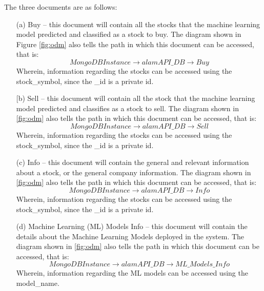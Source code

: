 The three documents are as follows:
\begin{itemize}
    \item[(a)] Buy – this document will contain all the stocks that 
    the machine learning model predicted and classified as a stock to buy. 
    The diagram shown in Figure \ref{fig:odm} also tells the path in which this 
    document can be accessed, that is: $$ MongoDB Instance \rightarrow alamAPI\_DB 
    \rightarrow Buy$$ Wherein, information regarding the stocks can be accessed using 
    the stock\_symbol, since the \_id is a private id.
    \item[[b)] Sell – this document will contain all the stock that the 
    machine learning model predicted and classifies as a stock to sell. 
    The diagram shown in \ref{fig:odm} also tells the path in which this 
    document can be accessed, that is: $$ MongoDB Instance \rightarrow 
    alamAPI\_DB \rightarrow Sell$$
     Wherein, information regarding the stocks can be accessed using the 
     stock\_symbol, since the \_id is a private id.
    \item[(c)] Info – this document will contain the general and relevant 
    information about a stock, or the general company information. 
    The diagram shown in \ref{fig:odm} also tells the path in which this 
    document can be accessed, that is: 
    $$ MongoDB Instance \rightarrow alamAPI\_DB \rightarrow Info $$ 
    Wherein, information regarding the stocks can be accessed using the 
    stock\_symbol, since the \_id is a private id.
    \item[(d)] Machine Learning (ML) Models Info – this document will contain
    the details about the Machine Learning Models deployed in the system. 
    The diagram shown in \ref{fig:odm} also tells the path in which this
    document can be accessed, that is:
    $$ MongoDB Instance \rightarrow alamAPI\_DB \rightarrow ML\_Models\_Info $$
    Wherein, information regarding the ML models can be accessed using the model\_name.
\end{itemize}